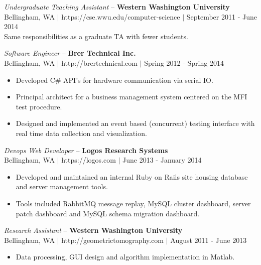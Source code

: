 \documentclass[line,margin]{res}
\begin{document}
\begin{resume}
	{\sl Undergraduate Teaching Assistant} -- {\bf Western Washington University} \\
	{\footnotesize Bellingham, WA $|$ https://cse.wwu.edu/computer-science $|$ September 2011 - June 2014} \\
	Same responsibilities as a graduate TA with fewer students. 
	
	{\sl Software Engineer} -- {\bf Brer Technical Inc.} \\
	{\footnotesize Bellingham, WA $|$ http://brertechnical.com $|$ Spring 2012 - Spring 2014}
	\begin{itemize} \itemsep -2pt
		\item Developed C\# API's for hardware communication via serial IO.
		\item Principal architect for a business management system centered on the MFI test procedure.
		\item Designed and implemented an event based (concurrent) testing interface with real time data collection and visualization.
	\end{itemize}
 
	{\sl Devops Web Developer} -- {\bf Logos Research Systems} \\
	{\footnotesize Bellingham, WA $|$ https://logos.com $|$ June 2013 - January 2014}
	\begin{itemize} \itemsep -2pt
		\item Developed and maintained an internal Ruby on Rails site housing database and server management tools.
		\item Tools included RabbitMQ message replay, MySQL cluster dashboard, server patch dashboard and MySQL schema migration dashboard.
	\end{itemize}

	{\sl Research Assistant} -- {\bf Western Washington University} \\
	{\footnotesize Bellingham, WA $|$ http://geometrictomography.com $|$ August 2011 - June 2013}
	\begin{itemize}  \itemsep -2pt
		\item Data processing, GUI design and algorithm implementation in Matlab.
	\end{itemize} 



\end{resume}
\end{document}
